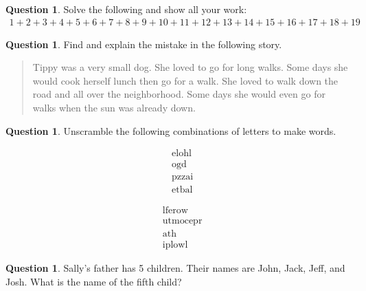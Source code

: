 \documentclass[12pt]{article}
\theoremstyle{definition}
\newtheorem{question}[thm]{Question}
\begin{document}
\vspace{2cm}

\begin{question}
	Solve the following and show all your work:
	\begin{align*}
	1+2+3+4+5+6+7+8+9+10+11+12+13+14+15+16+17+18+19
	\end{align*}
\end{question}

\vspace{4cm}

\begin{question}
	Find and explain the mistake in the following story.
	\begin{quote}
		Tippy was a very small dog. She loved to go for long walks. Some days she would cook herself lunch then go for a walk. She loved to walk down the road and all over the neighborhood. Some days she would even go for walks when the sun was already down. 
	\end{quote}
\end{question}

\newpage

\begin{question}
	Unscramble the following combinations of letters to make words.
	\begin{multicols}{2}\begin{large}
	\begin{align*}
	&\textrm{elohl} \\
	&\textrm{ogd} \\
	&\textrm{pzzai} \\
	&\textrm{etbal} 
	\end{align*}	
	
	\begin{align*}
	&\textrm{lferow} \\
	&\textrm{utmocepr} \\
	&\textrm{ath} \\
	&\textrm{iplowl} 
	\end{align*}
	
	\end{large}\end{multicols}
\end{question}

\begin{question}
	Sally's father has 5 children. Their names are John, Jack, Jeff, and Josh. What is the name of the fifth child?
\end{question}

\vspace{2cm}
\end{document}

